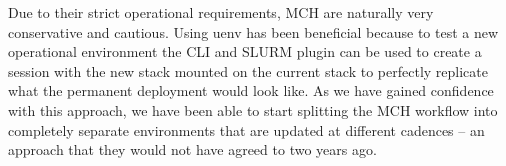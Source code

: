Due to their strict operational requirements, MCH are naturally very conservative and cautious.
Using uenv has been beneficial because to test a new operational environment the CLI and SLURM plugin can be used to create a session with the new stack mounted on the current stack to perfectly replicate what the permanent deployment would look like.
As we have gained confidence with this approach, we have been able to start splitting the MCH workflow into completely separate environments that are updated at different cadences -- an approach that they would not have agreed to two years ago.

